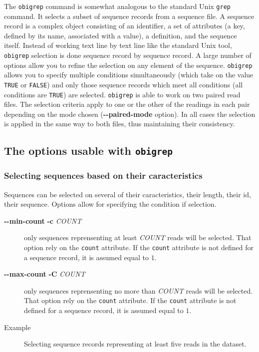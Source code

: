 \documentclass[
  letterpaper,
  DIV=11,
  numbers=noendperiod]{scrreprt}
\begin{document}
The \texttt{obigrep} command is somewhat analogous to the standard Unix
\texttt{grep} command. It selects a subset of sequence records from a
sequence file. A sequence record is a complex object consisting of an
identifier, a set of attributes (a key, defined by its name, associated
with a value), a definition, and the sequence itself. Instead of working
text line by text line like the standard Unix tool, \texttt{obigrep}
selection is done sequence record by sequence record. A large number of
options allow you to refine the selection on any element of the
sequence. \texttt{obigrep} allows you to specify multiple conditions
simultaneously (which take on the value \texttt{TRUE} or \texttt{FALSE})
and only those sequence records which meet all conditions (all
conditions are \texttt{TRUE}) are selected. \texttt{obigrep} is able to
work on two paired read files. The selection criteria apply to one or
the other of the readings in each pair depending on the mode chosen
(\textbf{-\/-paired-mode} option). In all cases the selection is applied
in the same way to both files, thus maintaining their consistency.

\hypertarget{the-options-usable-with-obigrep}{%
\subsection{\texorpdfstring{The options usable with
\texttt{obigrep}}{The options usable with obigrep}}\label{the-options-usable-with-obigrep}}

\hypertarget{selecting-sequences-based-on-their-caracteristics}{%
\subsubsection{Selecting sequences based on their
caracteristics}\label{selecting-sequences-based-on-their-caracteristics}}

Sequences can be selected on several of their caracteristics, their
length, their id, their sequence. Options allow for specifying the
condition if selection.

\begin{description}
\item[\textbf{-\/-min-count} \textbar{} \textbf{-c} \emph{COUNT}]
only sequences reprensenting at least \emph{COUNT} reads will be
selected. That option rely on the \texttt{count} attribute. If the
\texttt{count} attribute is not defined for a sequence record, it is
assumed equal to \(1\).
\item[\textbf{-\/-max-count} \textbar{} \textbf{-C} \emph{COUNT}]
only sequences reprensenting no more than \emph{COUNT} reads will be
selected. That option rely on the \texttt{count} attribute. If the
\texttt{count} attribute is not defined for a sequence record, it is
assumed equal to \(1\).
\item[Example]
Selecting sequence records representing at least five reads in the
dataset.
\end{description}
\end{document}
